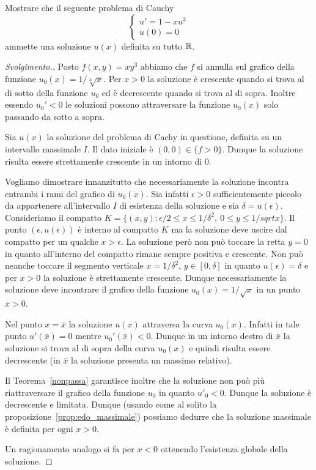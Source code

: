 \begin{example}
Mostrare che il seguente problema di Cauchy
\[
\begin{cases}
  u'=1-x u^3\\
  u(0)=0
\end{cases}
\]
ammette una soluzione $u(x)$ definita su tutto $\mathbb R$.
\end{example}
%
\begin{proof}[Svolgimento.]
Posto $f(x,y)=xy^3$ abbiamo che $f$ si annulla sul grafico della
funzione $u_0(x)=1/\sqrt[3] x$. Per $x>0$ la soluzione è crescente
quando si trova al di sotto della funzione $u_0$ ed è decrescente
quando si trova al di sopra. Inoltre essendo $u_0'<0$ le soluzioni possono
attraversare la funzione $u_0(x)$ solo passando da sotto a
sopra.

Sia $u(x)$ la soluzione del problema di Cachy in questione, definita su
un intervallo massimale $I$. Il dato
iniziale è $(0,0)\in \{f>0\}$. Dunque la soluzione risulta essere
strettamente crescente in un intorno di $0$.

Vogliamo dimostrare innanzitutto che necessariamente la soluzione
incontra entrambi i rami del grafico di $u_0(x)$. Sia infatti
$\epsilon>0$ sufficientemente piccolo da appartenere all'intervallo
$I$ di
esistenza della soluzione e sia $\delta=u(\epsilon)$.
Consideriamo il compatto $K=\{(x,y):
\epsilon/2 \le x \le 1/\delta^2,\ 0\le y\le 1/sqrt{x}\}$. Il punto
$(\epsilon,u(\epsilon))$ è interno al compatto $K$ ma la soluzione deve
uscire dal compatto
per un qualche $x>\epsilon$.
La soluzione però non può toccare la
retta $y=0$ in quanto all'interno del compatto rimane sempre positiva
e crescente.
Non può neanche toccare il segmento verticale
$x=1/\delta^2$, $y\in[0,\delta]$ in quanto $u(\epsilon)=\delta$ e per
$x>0$ la soluzione è strettamente crescente.
Dunque necessariamente
la soluzione deve incontrare il grafico della funzione
$u_0(x)=1/\sqrt{x}$ in un punto $\bar x>0$.

Nel punto $x=\bar x$ la soluzione $u(x)$ attraversa la curva
$u_0(x)$. Infatti in tale punto $u'(\bar x)=0$ mentre $u_0'(\bar
x)<0$.
Dunque in un intorno destro di $\bar x$ la soluzione si trova
al di sopra della curva $u_0(x)$ e quindi risulta essere decrescente
(in $\bar x$ la soluzione presenta un massimo relativo).

Il Teorema~\ref{nonpassa} garantisce inoltre che la soluzione non
può più riattraversare il grafico della funzione $u_0$ in quanto
$u'_0<0$. Dunque la soluzione è decrescente e limitata.
Dunque (usando come al solito la proposizione~\ref{prop:edo_massimale})
possiamo dedurre che la soluzione massimale è definita per ogni $x>0$.

Un ragionamento analogo si fa per $x<0$ ottenendo l'esistenza globale
della soluzione.
\end{proof}

